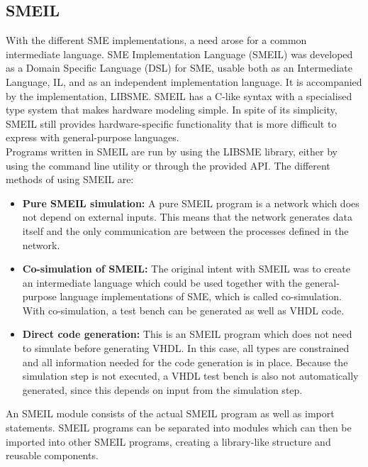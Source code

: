 \subsection{SMEIL}
\label{sec:background_smeil}
With the different SME implementations, a need arose for a common intermediate language. SME Implementation Language (SMEIL) was developed as a Domain Specific Language (DSL) for SME, usable both as an Intermediate Language, IL, and as an independent implementation language. It is accompanied by the implementation, LIBSME. %
SMEIL has a C-like syntax with a specialised type system that makes hardware modeling simple. In spite of its simplicity, SMEIL still provides hardware-specific functionality that is more difficult to express with general-purpose languages.\\

Programs written in SMEIL are run by using the LIBSME library, either by using the command line utility or through the provided API.
The different methods of using SMEIL are:\\
\begin{itemize}
    \item \textbf{Pure SMEIL simulation:} A pure SMEIL program is a network which does not depend on external inputs. This means that the network generates data itself and the only communication are between the processes defined in the network.
    \item \textbf{Co-simulation of SMEIL:} The original intent with SMEIL was to create an intermediate language which could be used together with the general-purpose language implementations of SME, which is called co-simulation. With co-simulation, a test bench can be generated as well as VHDL code.%
    \item \textbf{Direct code generation:} This is an SMEIL program which does not need to simulate before generating VHDL. In this case, all types are constrained and all information needed for the code generation is in place. Because the simulation step is not executed, a VHDL test bench is also not automatically generated, since this depends on input from the simulation step.
\end{itemize}
An SMEIL module consists of the actual SMEIL program as well as import statements. SMEIL programs can be separated into modules which can then be imported into other SMEIL programs, creating a library-like structure and reusable components.\\


